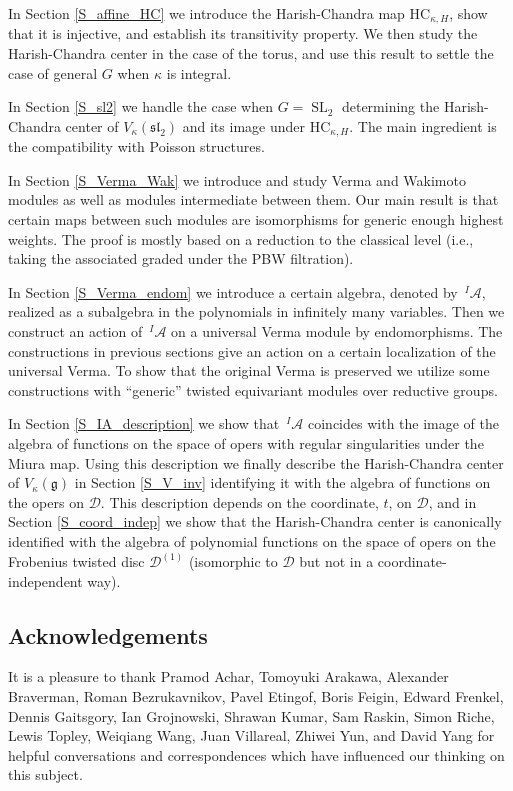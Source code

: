 \documentclass{amsart}
\theoremstyle{definition}
\newcommand{\D}{\sD}
\newcommand{\sD}{\mathscr{D}}
\newcommand{\g}{\mathfrak{g}}
\newcommand{\HC}{\mathrm{HC}} %
\newcommand{\A}{\mathscr{A}}
\numberwithin{equation}{section}
\begin{document}
In Section \ref{S_affine_HC} we introduce the Harish-Chandra map $\HC_{\kappa,H}$, show that it is injective, and establish its transitivity property. We then study the Harish-Chandra center in the case of the torus, and use this result to settle the case of general $G$ when $\kappa$ is integral.

In Section \ref{S_sl2} we handle the case when $G=\operatorname{SL}_2$ determining the Harish-Chandra center of $V_\kappa(\mathfrak{sl}_2)$ and its image under $\HC_{\kappa,H}$. The main ingredient is the compatibility with Poisson structures. 

In Section \ref{S_Verma_Wak} we introduce and study Verma and Wakimoto modules as well as modules intermediate between them. Our main result is that certain maps between such modules are isomorphisms for generic enough highest weights. The proof is mostly based on a reduction to the classical level (i.e., taking the associated graded under the PBW filtration).  

In Section \ref{S_Verma_endom} we introduce   a certain algebra, denoted by $\,^I\!\A$, realized as a subalgebra in the polynomials in infinitely many variables. Then we construct an action of $\,^I\!\A$ on a universal Verma module by endomorphisms. The constructions in previous sections give an action on a certain localization of the universal Verma. To show that the original Verma is preserved we utilize some constructions with ``generic'' twisted equivariant modules over reductive groups.

In Section \ref{S_IA_description} we show that $\,^I\!\A$ coincides with the image  of the algebra of functions on the space of opers with regular singularities under the Miura map. Using this description we finally describe the Harish-Chandra center of $V_\kappa(\g)$ in Section \ref{S_V_inv} identifying it with the algebra of functions on the opers on $\D$. This description depends on the coordinate, $t$, on $\D$, and in Section \ref{S_coord_indep} we show that the Harish-Chandra center is canonically identified with the algebra of polynomial functions on the space of opers on the Frobenius twisted disc $\D^{(1)}$ (isomorphic to $\D$ but not in a coordinate-independent way).



\subsection{Acknowledgements} It is a pleasure to thank Pramod Achar, Tomoyuki Arakawa, Alexander Braverman, Roman Bezrukavnikov, Pavel Etingof, Boris Feigin, Edward Frenkel, Dennis Gaitsgory, Ian Grojnowski, Shrawan Kumar,  Sam Raskin, Simon Riche, Lewis Topley,  Weiqiang Wang, Juan Villareal, Zhiwei Yun, and David Yang for helpful conversations and correspondences which have influenced our thinking on this subject.
\end{document}
